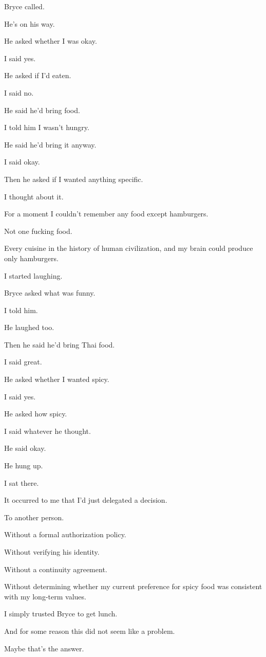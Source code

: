 \documentclass[11pt,oneside]{book}
\begin{document}
Bryce called.

He's on his way.

He asked whether I was okay.

I said yes.

He asked if I'd eaten.

I said no.

He said he'd bring food.

I told him I wasn't hungry.

He said he'd bring it anyway.

I said okay.

Then he asked if I wanted anything specific.

I thought about it.

For a moment I couldn't remember any food except hamburgers.

Not one fucking food.

Every cuisine in the history of human civilization, and my brain could produce only hamburgers.

I started laughing.

Bryce asked what was funny.

I told him.

He laughed too.

Then he said he'd bring Thai food.

I said great.

He asked whether I wanted spicy.

I said yes.

He asked how spicy.

I said whatever he thought.

He said okay.

He hung up.

I sat there.

It occurred to me that I'd just delegated a decision.

To another person.

Without a formal authorization policy.

Without verifying his identity.

Without a continuity agreement.

Without determining whether my current preference for spicy food was consistent with my long-term values.

I simply trusted Bryce to get lunch.

And for some reason this did not seem like a problem.

Maybe that's the answer.
\end{document}
